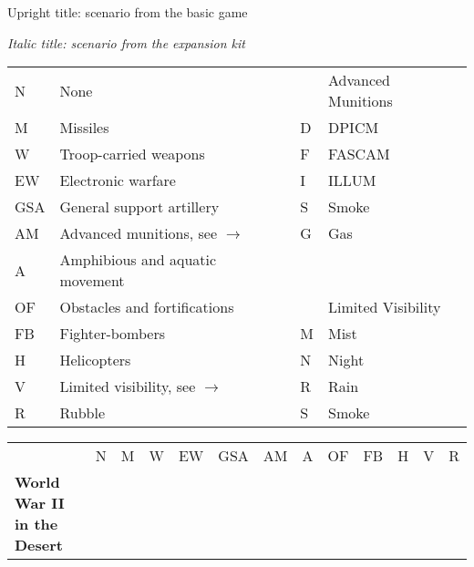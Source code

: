 \documentclass[a4paper]{article}
\newenvironment{texte}{\rmfamily\footnotesize}{}
\begin{document}
\begin{texte}


Upright title: scenario from the basic game

\textit{Italic title: scenario from the expansion kit}

\vspace*{5mm}

\begin{tabular}{llll}
N    &   None                                  &   & Advanced Munitions\\
M    &   Missiles                              & D & DPICM  \\
W    &   Troop-carried weapons                 & F & FASCAM \\
EW   &   Electronic warfare                    & I & ILLUM  \\
GSA  &   General support artillery             & S & Smoke  \\ 
AM   &   Advanced munitions, see $\rightarrow$ & G & Gas    \\ 
A    &   Amphibious and aquatic movement  \\
OF   &   Obstacles and fortifications          &   & Limited Visibility \\
FB   &   Fighter-bombers                       & M & Mist   \\
H    &   Helicopters                           & N & Night  \\
V    &   Limited visibility, see $\rightarrow$ & R & Rain   \\
R    &   Rubble                                & S & Smoke  \\
\end{tabular}

\begin{tabular}{lcccccccccccc}
                                                   & N &  M &  W & EW & GSA & AM & A & OF & FB & H &  V & R \\

\bf World War II in the Desert \\


\end{tabular}
\end{texte}
\end{document}
